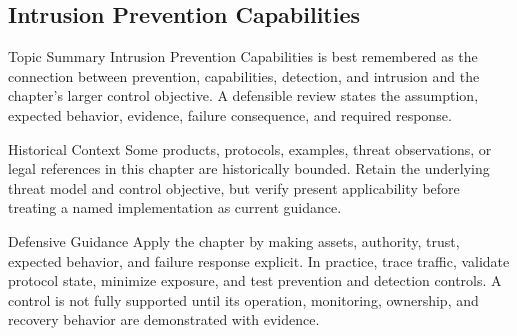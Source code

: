 \documentclass[11pt,letterpaper]{article}
\begin{document}
\subsection*{Intrusion Prevention Capabilities}
\begin{CornellNotesTable}
\end{CornellNotesTable}
\begin{CornellSummaryBox}{Topic Summary}
Intrusion Prevention Capabilities is best remembered as the connection between prevention, capabilities, detection, and intrusion and the chapter's larger control objective. A defensible review states the assumption, expected behavior, evidence, failure consequence, and required response.
\end{CornellSummaryBox}
\begin{CornellWarningBox}{Historical Context}
Some products, protocols, examples, threat observations, or legal references in this chapter are historically bounded. Retain the underlying threat model and control objective, but verify present applicability before treating a named implementation as current guidance.
\end{CornellWarningBox}
\begin{CornellOverviewBox}{Defensive Guidance}
Apply the chapter by making assets, authority, trust, expected behavior, and failure response explicit. In practice, trace traffic, validate protocol state, minimize exposure, and test prevention and detection controls. A control is not fully supported until its operation, monitoring, ownership, and recovery behavior are demonstrated with evidence.
\end{CornellOverviewBox}
\end{document}
